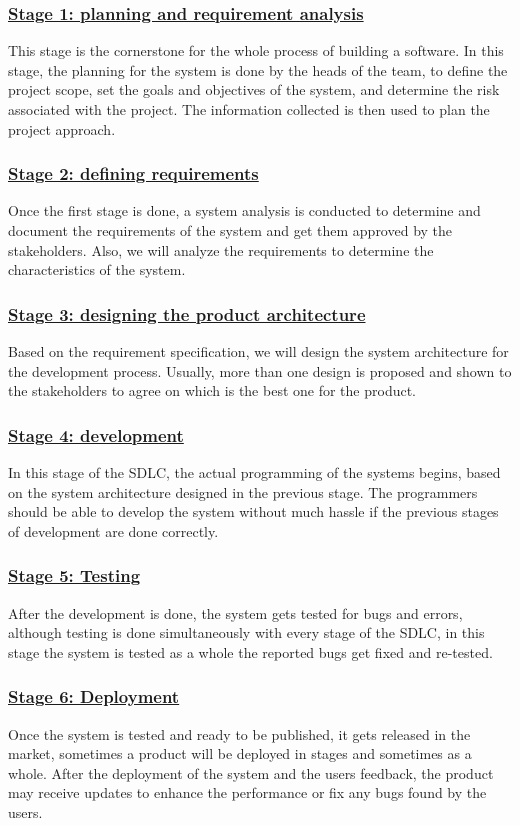 \documentclass[../main.tex]{subfiles}
\begin{document}
\subsubsection*{\underline{Stage 1: planning and requirement analysis
}}
This stage is the cornerstone for the whole process of building a software. In this stage, the planning for the system is done by the heads of the team, to define the project scope, set the goals and objectives of the system, and determine the risk associated with the project. The information collected is then used to plan the project approach. 
\subsubsection*{\underline{Stage 2: defining requirements
}} 
Once the first stage is done, a system analysis is conducted to determine and document the requirements of the system and get them approved by the stakeholders. Also, we will analyze the requirements to determine the characteristics of the system. 
\subsubsection*{\underline{Stage 3: designing the product architecture 
}} 
Based on the requirement specification, we will design the system architecture for the development process. Usually, more than one design is proposed and shown to the stakeholders to agree on which is the best one for the product. 
\subsubsection*{\underline{Stage 4: development
}}  
In this stage of the SDLC, the actual programming of the systems begins, based on the system architecture designed in the previous stage. The programmers should be able to develop the system without much hassle if the previous stages of development are done correctly. 
\subsubsection*{\underline{Stage 5: Testing
}} 
After the development is done, the system gets tested for bugs and errors, although testing is done simultaneously with every stage of the SDLC, in this stage the system is tested as a whole the reported bugs get fixed and re-tested.
\subsubsection*{\underline{Stage 6: Deployment 
}} 
Once the system is tested and ready to be published, it gets released in the market, sometimes a product will be deployed in stages and sometimes as a whole. After the deployment of the system and the users feedback, the product may receive updates to enhance the performance or fix any bugs found by the users. 
\end{document}
